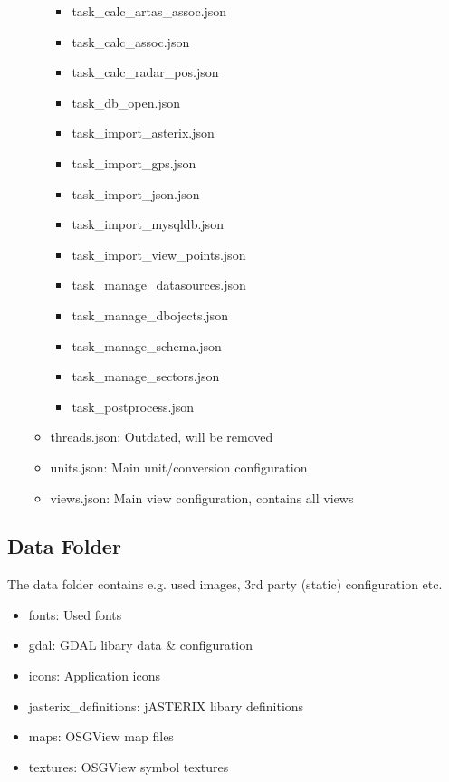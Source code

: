 \begin{itemize}
\begin{itemize}
    \begin{itemize}
        \item task\_calc\_artas\_assoc.json
        \item task\_calc\_assoc.json
        \item task\_calc\_radar\_pos.json
        \item task\_db\_open.json
        \item task\_import\_asterix.json
        \item task\_import\_gps.json
        \item task\_import\_json.json
        \item task\_import\_mysqldb.json
        \item task\_import\_view\_points.json
        \item task\_manage\_datasources.json
        \item task\_manage\_dbojects.json
        \item task\_manage\_schema.json
        \item task\_manage\_sectors.json
        \item task\_postprocess.json
    \end{itemize}
    \item threads.json: Outdated, will be removed
    \item units.json: Main unit/conversion configuration
    \item views.json: Main view configuration, contains all views
\end{itemize}
\end{itemize}


\subsection{Data Folder}
\label{sec:appendix_config_data_folder}

The data folder contains e.g. used images, 3rd party (static) configuration etc.

\begin{itemize}
\item fonts: Used fonts
\item gdal: GDAL libary data \& configuration
\item icons: Application icons
\item jasterix\_definitions: jASTERIX libary definitions
\item maps: OSGView map files
\item textures: OSGView symbol textures
\end{itemize}
